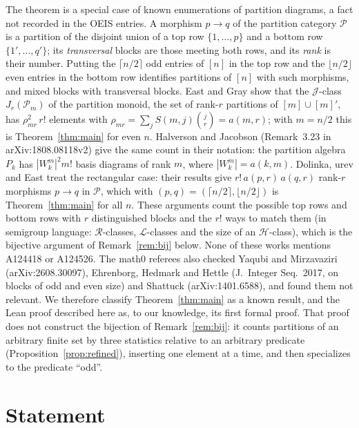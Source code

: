 \documentclass[11pt]{amsart}
\theoremstyle{plain}
\theoremstyle{definition}
\begin{document}
The theorem is a special case of known enumerations of partition diagrams, a fact not recorded in the OEIS entries.
A morphism $p\to q$ of the partition category $\mathcal P$ is a partition of the disjoint union of a top row $\{1,\dots,p\}$ and a bottom row $\{1',\dots,q'\}$; its \emph{transversal} blocks are those meeting both rows, and its \emph{rank} is their number.
Putting the $\lceil n/2\rceil$ odd entries of $[n]$ in the top row and the $\lfloor n/2\rfloor$ even entries in the bottom row identifies partitions of $[n]$ with such morphisms, and mixed blocks with transversal blocks.
East and Gray \cite[proof of Theorem~7.5 and Remark~7.7 of the arXiv version]{EG17} show that the $\mathscr J$-class $J_r(\mathcal P_m)$ of the partition monoid, the set of rank-$r$ partitions of $[m]\cup[m]'$, has $\rho_{mr}^2\,r!$ elements with $\rho_{mr}=\sum_j S(m,j)\binom jr=a(m,r)$; with $m=n/2$ this is Theorem~\ref{thm:main} for even $n$.
Halverson and Jacobson \cite[Remark~3.9]{HJ20} (Remark~3.23 in arXiv:1808.08118v2) give the same count in their notation: the partition algebra $P_k$ has $|W^m_k|^2m!$ basis diagrams of rank $m$, where $|W^m_k|=a(k,m)$.
Dolinka, \DJ ur\dj ev and East \cite[Proposition~4.11 and Remark~4.12 of the arXiv version]{DDE21} treat the rectangular case: their results give $r!\,a(p,r)\,a(q,r)$ rank-$r$ morphisms $p\to q$ in $\mathcal P$, which with $(p,q)=(\lceil n/2\rceil,\lfloor n/2\rfloor)$ is Theorem~\ref{thm:main} for all $n$.
These arguments count the possible top rows and bottom rows with $r$ distinguished blocks and the $r!$ ways to match them (in semigroup language: $\mathscr R$-classes, $\mathscr L$-classes and the size of an $\mathscr H$-class), which is the bijective argument of Remark~\ref{rem:bij} below.
None of these works mentions A124418 or A124526.
The math0 referees also checked Yaqubi and Mirzavaziri (arXiv:2608.30097), Ehrenborg, Hedmark and Hettle (J.~Integer Seq.\ 2017, on blocks of odd and even size) and Shattuck (arXiv:1401.6588), and found them not relevant.
We therefore classify Theorem~\ref{thm:main} as a known result, and the Lean proof described here as, to our knowledge, its first formal proof.
That proof does not construct the bijection of Remark~\ref{rem:bij}: it counts partitions of an arbitrary finite set by three statistics relative to an arbitrary predicate (Proposition~\ref{prop:refined}), inserting one element at a time, and then specializes to the predicate ``odd''.

\section{Statement}\label{sec:statement}
\end{document}
